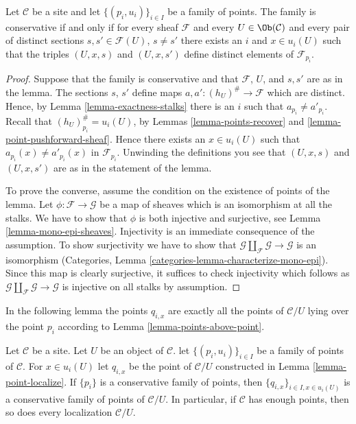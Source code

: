 \begin{lemma}
\label{lemma-enough}
Let $\mathcal{C}$ be a site and let $\{(p_i, u_i)\}_{i\in I}$ be a
family of points. The family is conservative if and only if for every
sheaf $\mathcal{F}$ and every $U\in \Ob(\mathcal{C})$ and every
pair of distinct sections $s, s' \in \mathcal{F}(U)$, $s \not = s'$ there
exists an $i$ and $x\in u_i(U)$ such that the triples
$(U, x, s)$ and $(U, x, s')$ define distinct elements of
$\mathcal{F}_{p_i}$.
\end{lemma}

\begin{proof}
Suppose that the family is conservative and that $\mathcal{F}$, $U$, and
$s, s'$ are as in the lemma. The sections $s$, $s'$ define maps
$a, a' : (h_U)^\# \to \mathcal{F}$ which are distinct. Hence, by Lemma
\ref{lemma-exactness-stalks} there is an $i$ such that $a_{p_i}
\not = a'_{p_i}$. Recall that $(h_U)^\#_{p_i} = u_i(U)$, by
Lemmas \ref{lemma-points-recover} and
\ref{lemma-point-pushforward-sheaf}.
Hence there exists an $x \in u_i(U)$ such that $a_{p_i}(x)
\not = a'_{p_i}(x)$ in $\mathcal{F}_{p_i}$.
Unwinding the definitions you see that $(U, x, s)$
and $(U, x, s')$ are as in the statement of the lemma.

\medskip\noindent
To prove the converse, assume the condition on the existence of
points of the lemma. Let $\phi : \mathcal{F} \to \mathcal{G}$
be a map of sheaves which is an isomorphism at all the stalks.
We have to show that $\phi$ is both
injective and surjective, see Lemma \ref{lemma-mono-epi-sheaves}.
Injectivity is an immediate consequence of the assumption.
To show surjectivity we have to show that
$\mathcal{G} \amalg_\mathcal{F} \mathcal{G} \to \mathcal{G}$
is an isomorphism
(Categories, Lemma \ref{categories-lemma-characterize-mono-epi}).
Since this map is clearly surjective, it suffices to check injectivity
which follows as $\mathcal{G} \amalg_\mathcal{F} \mathcal{G} \to \mathcal{G}$
is injective on all stalks by assumption.
\end{proof}

\noindent
In the following lemma the points $q_{i, x}$ are exactly all the points
of $\mathcal{C}/U$ lying over the point $p_i$ according to
Lemma \ref{lemma-points-above-point}.

\begin{lemma}
\label{lemma-localize-enough}
Let $\mathcal{C}$ be a site. Let $U$ be an object of $\mathcal{C}$.
let $\{(p_i, u_i)\}_{i\in I}$ be a family of points of $\mathcal{C}$.
For $x \in u_i(U)$ let $q_{i, x}$ be the point of $\mathcal{C}/U$
constructed in
Lemma \ref{lemma-point-localize}.
If $\{p_i\}$ is a conservative family of points, then
$\{q_{i, x}\}_{i \in I, x \in u_i(U)}$ is a conservative
family of points of $\mathcal{C}/U$.
In particular, if $\mathcal{C}$ has enough points, then so
does every localization $\mathcal{C}/U$.
\end{lemma}

